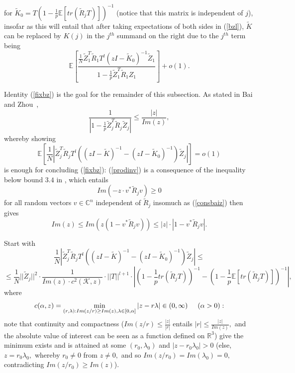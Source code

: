 \documentclass{article}
\numberwithin{equation}{section}
\begin{document}
for \(\tilde{K}_0=T(1-\frac{1}{p}\mathbb{E}[tr(\tilde{R}_jT)])^{-1}\) (notice that this matrix is independent of \(j\)), insofar as this will entail that after taking expectations of both sides in (\ref{bzl}), \(\tilde{K}\) can be replaced by \(K(j)\) in the \(j^{th}\) summand on the right %
due to the \(j^{th}\) term being
\[\mathbb{E}[\frac{\frac{1}{N}\tilde{Z}_1^T\tilde{R}_1T^l(zI-\tilde{K}_0)^{-1}\tilde{Z}_1}{1-\frac{1}{p}\tilde{Z}_1^T\tilde{R}_1Z_1}]+o(1).\]
\vspace{0.3cm}
\par
Identity (\ref{fixbz}) is the goal for the remainder of this subsection. As stated in Bai and Zhou~\cite{baizhou},
\begin{equation}\label{prodinv}
    \frac{1}{|1-\frac{1}{p}\tilde{Z}_j^T\tilde{R}_j\tilde{Z}_j|} \leq \frac{|z|}{Im(z)},
\end{equation}
whereby showing 
\[\mathbb{E}[\frac{1}{N}|\tilde{Z}_j^T\tilde{R}_jT^l((zI-\tilde{K})^{-1}-(zI-\tilde{K}_0)^{-1})\tilde{Z}_j|]=o(1)\]
is enough for concluding (\ref{fixbz}): (\ref{prodinv}) is a consequence of the inequality below bound \(3.4\) in \cite{baizhou}, which entails %
\begin{equation}\label{consbaiz}
    Im(-z \cdot v^*\tilde{R}_jv) \geq 0
\end{equation}
for all random vectors \(v \in \mathbb{C}^n\) independent of \(\tilde{R}_j\) insomuch as (\ref{consbaiz}) then gives
\[Im(z) \leq Im(z(1-v^*\tilde{R}_jv)) \leq |z| \cdot |1-v^*\tilde{R}_jv|.\]
\par
Start with
\[\frac{1}{N}|\tilde{Z}_j^T\tilde{R}_jT^l((zI-\tilde{K})^{-1}-(zI-\tilde{K}_0)^{-1})\tilde{Z}_j| \leq\]
\begin{equation}\label{id1}
    \leq \frac{1}{N}||\tilde{Z}_j||^2 \cdot \frac{1}{Im(z) \cdot c^2(\mathcal{K},z)} \cdot ||T||^{l+1} \cdot |(1-\frac{1}{p}tr(\tilde{R}_jT))^{-1}-(1-\frac{1}{p}\mathbb{E}[tr(\tilde{R}_jT)])^{-1}|,
\end{equation}
where 
\[c(\alpha,z)=\min_{(r,\lambda):Im(z/r) \geq Im(z),\lambda \in [0,\alpha]}{|z-r\lambda|} \in (0,\infty) \hspace{0.5cm} (\alpha>0):\]
note that continuity and compactness (\(Im(z/r) \leq \frac{|z|}{|r|}\) entails \(|r| \leq \frac{|z|}{Im(z)},\) and the absolute value of interest can be seen as a function defined on \(\mathbb{R}^3\)) give the minimum exists and is attained at some \((r_0,\lambda_0)\) and \(|z-r_0\lambda_0|>0\) (else, \(z=r_0\lambda_0,\) whereby \(r_0 \ne 0\) from \(z \ne 0,\) and so \(Im(z/r_0)=Im(\lambda_0)=0,\) contradicting \(Im(z/r_0) \geq Im(z)\)).
\end{document}
